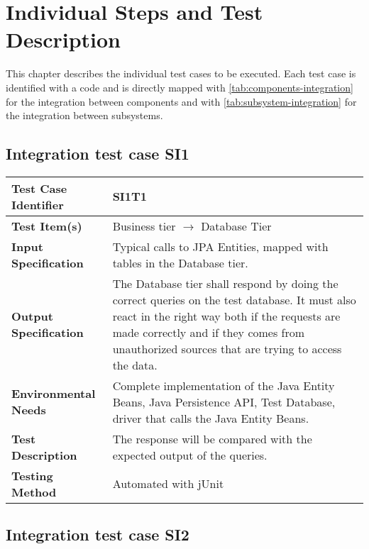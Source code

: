 \chapter{Individual Steps and Test Description}
\label{chap:individual-steps}

This chapter describes the individual test cases to be executed.
Each test case is identified with a code and is directly mapped with \autoref{tab:components-integration} for the integration between components and with \autoref{tab:subsystem-integration} for the integration between subsystems.

\section{Integration test case SI1}

\begin{tabular}{l p{}}
    \hline
    \textbf{Test Case Identifier} & SI1T1\\
    \hline
    \textbf{Test Item(s)} & Business tier $\rightarrow$ Database Tier\\
    \hline
    \textbf{Input Specification} & Typical calls to JPA Entities, mapped with tables in the Database tier.\\
    \hline
    \textbf{Output Specification} & The Database tier shall respond by doing the correct queries on the test database. It must also react in the right way both if the requests are made correctly and if they comes from unauthorized sources that are trying to access the data.\\
    \hline
    \textbf{Environmental Needs} & Complete implementation of the Java Entity Beans, Java Persistence API, Test Database, driver that calls the Java Entity Beans. \\
    \hline
    \textbf{Test Description} & The response will be compared with the expected output of the queries.\\
    \hline
    \textbf{Testing Method} & Automated with jUnit \\
    \hline
\end{tabular}

\vspace{2em}

\section{Integration test case SI2}

